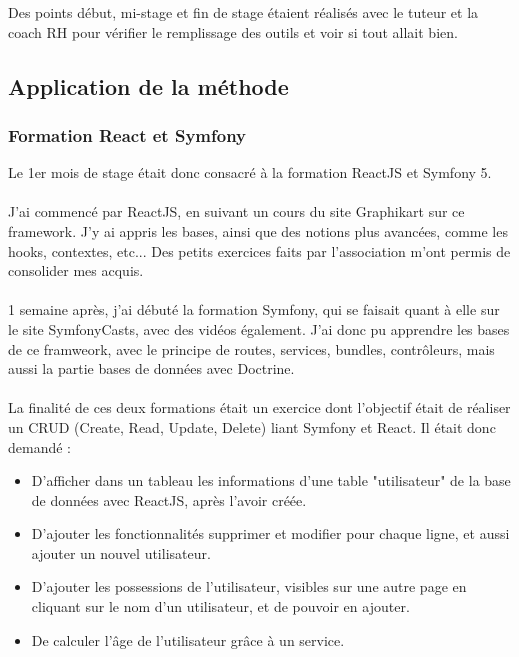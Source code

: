 Des points début, mi-stage et fin de stage étaient réalisés avec le tuteur et la coach RH pour vérifier le remplissage des outils et voir si tout allait bien.

\pagebreak
\subsection{Application de la méthode}

\subsubsection{Formation React et Symfony}

Le 1er mois de stage était donc consacré à la formation ReactJS et Symfony 5.\\\\
J'ai commencé par ReactJS, en suivant un cours du site Graphikart sur ce framework. 
J'y ai appris les bases, ainsi que des notions plus avancées, comme les hooks, contextes, etc...
Des petits exercices faits par l'association m'ont permis de consolider mes acquis.\\\\

1 semaine après, j'ai débuté la formation Symfony, qui se faisait quant à elle sur le site SymfonyCasts, avec des vidéos également.
J'ai donc pu apprendre les bases de ce framweork, avec le principe de routes, services, bundles, contrôleurs, mais aussi la partie bases de données avec Doctrine.\\\\

La finalité de ces deux formations était un exercice dont l'objectif était de réaliser un CRUD (Create, Read, Update, Delete) liant Symfony et React.
Il était donc demandé :\\
\begin{itemize}
    \item D'afficher dans un tableau les informations d'une table "utilisateur" de la base de données avec ReactJS, après l'avoir créée.
    \item D'ajouter les fonctionnalités supprimer et modifier pour chaque ligne, et aussi ajouter un nouvel utilisateur.
    \item D'ajouter les possessions de l'utilisateur, visibles sur une autre page en cliquant sur le nom d'un utilisateur, et de pouvoir en ajouter.
    \item De calculer l'âge de l'utilisateur grâce à un service.
\end{itemize}

